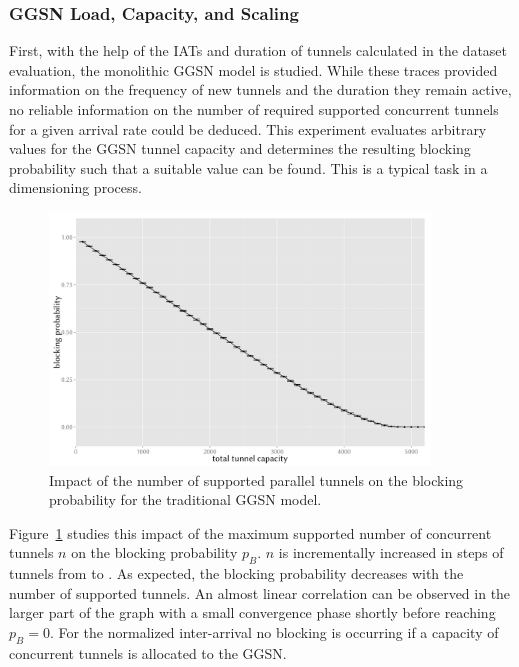 \subsubsection{GGSN Load, Capacity, and Scaling}

First, with the help of the \glspl{IAT} and duration of tunnels calculated in the dataset evaluation, the monolithic \gls{GGSN} model is studied. While these traces provided information on the frequency of new tunnels and the duration they remain active, no reliable information on the number of required supported concurrent tunnels for a given arrival rate could be deduced. 
This experiment evaluates arbitrary values for the \gls{GGSN} tunnel capacity and determines the resulting blocking probability such that a suitable value can be found. This is a typical task in a dimensioning process.

\begin{figure}[htb]
	\centering
	\includegraphics[width=0.9\textwidth]{images/R-monolithic-blocking.pdf}
	\caption{Impact of the number of supported parallel tunnels on the blocking probability for the traditional \acrshort{GGSN} model.}
\label{c4:fig:traditional_blocking}
\end{figure}

Figure~\ref{c4:fig:traditional_blocking} studies this impact of the maximum supported number of concurrent tunnels $n$ on the blocking probability $p_B$. $n$ is incrementally increased in steps of  tunnels from  to . As expected, the blocking probability decreases with the number of supported tunnels. An almost linear correlation can be observed in the larger part of the graph with a small convergence phase shortly before reaching $p_B=0$. For the normalized inter-arrival no blocking is occurring if a capacity of  concurrent tunnels is allocated to the \gls{GGSN}.

